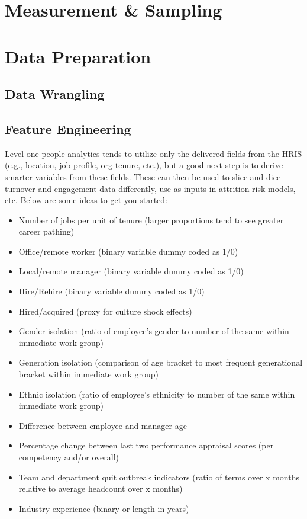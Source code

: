 \documentclass[]{book}
\providecommand{\tightlist}{%
  \setlength{\itemsep}{0pt}\setlength{\parskip}{0pt}}
\begin{document}
\hypertarget{measurement-sampling}{%
\chapter{Measurement \& Sampling}\label{measurement-sampling}}

\hypertarget{data-preparation}{%
\chapter{Data Preparation}\label{data-preparation}}

\hypertarget{data-wrangling}{%
\section{Data Wrangling}\label{data-wrangling}}

\hypertarget{feature-engineering}{%
\section{Feature Engineering}\label{feature-engineering}}

Level one people analytics tends to utilize only the delivered fields from the HRIS (e.g., location, job profile, org tenure, etc.), but a good next step is to derive smarter variables from these fields. These can then be used to slice and dice turnover and engagement data differently, use as inputs in attrition risk models, etc. Below are some ideas to get you started:

\begin{itemize}
\tightlist
\item
  Number of jobs per unit of tenure (larger proportions tend to see greater career pathing)
\item
  Office/remote worker (binary variable dummy coded as 1/0)
\item
  Local/remote manager (binary variable dummy coded as 1/0)
\item
  Hire/Rehire (binary variable dummy coded as 1/0)
\item
  Hired/acquired (proxy for culture shock effects)
\item
  Gender isolation (ratio of employee's gender to number of the same within immediate work
  group)
\item
  Generation isolation (comparison of age bracket to most frequent generational bracket within
  immediate work group)
\item
  Ethnic isolation (ratio of employee's ethnicity to number of the same within immediate work
  group)
\item
  Difference between employee and manager age
\item
  Percentage change between last two performance appraisal scores (per competency and/or
  overall)
\item
  Team and department quit outbreak indicators (ratio of terms over x months relative to average
  headcount over x months)
\item
  Industry experience (binary or length in years)
\end{itemize}
\end{document}
